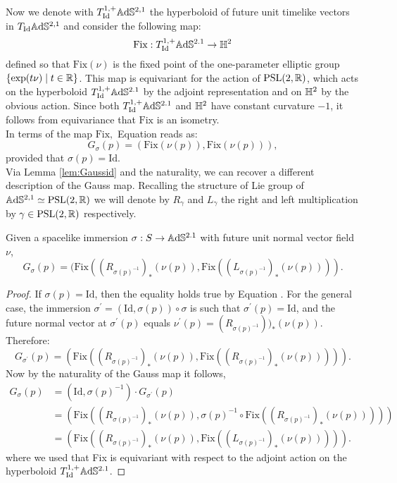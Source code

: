 Now we denote with $T_{\text{Id}}^{1,+}\mathbb{A}\mathrm{d}\mathbb{S}^{2,1}$ the hyperboloid of future unit timelike vectors in $T_{\text{Id}}\mathbb{A}\mathrm{d}\mathbb{S}^{2,1}$ and consider the following map: 
\[
    \text{Fix}:T_{\text{Id}}^{1,+}\mathbb{A}\mathrm{d}\mathbb{S}^{2.1}\to\mathbb{H}^2
\]
defined so that $\text{Fix}(\nu)$ is the fixed point of the one-parameter elliptic group $\{\exp(t\nu)\;|\;t\in\mathbb{R}\}$. This map is equivariant for the action of $\text{PSL}(2,\mathbb{R})$, which acts on the hyperboloid $T_{\text{Id}}^{1,+}\mathbb{A}\mathrm{d}\mathbb{S}^{2.1}$ by the adjoint representation and on $\mathbb{H}^2$ by the obvious action. Since both $T_{\text{Id}}^{1,+}\mathbb{A}\mathrm{d}\mathbb{S}^{2.1}$ and $\mathbb{H}^2$ have constant curvature $-1$, it follows from equivariance that $\text{Fix}$ is an isometry.  \\
In terms of the map $\text{Fix},$ Equation  reads as: 
\begin{equation}\label{eq:Gaussfix}
    G_\sigma(p)=(\text{Fix}(\nu(p)),\text{Fix}(\nu(p))),
\end{equation}
provided that $\sigma(p)=\text{Id}.$\\ Via Lemma \ref{lem:Gaussid} and the naturality, we can recover a different description of the Gauss map. Recalling the structure of Lie group of $\mathbb{A}\mathrm{d}\mathbb{S}^{2,1}\simeq\text{PSL}(2,\mathbb{R})$ we will denote by $R_{\gamma } $ and $L_{\gamma} $ the right and left multiplication by $\gamma\in\text{PSL}(2,\mathbb{R})$ respectively. 

\begin{lemma}\label{lem:gauss fix}
    Given a spacelike immersion $\sigma: S\to \mathbb{A}\mathrm{d}\mathbb{S}^{2.1}$ with future unit normal vector field $\nu$,
    \[
        G_\sigma(p)=(\text{Fix}((R_{\sigma(p)^{-1}})_* (\nu(p)),\text{Fix}((L_{\sigma(p)^{-1}})_* (\nu(p)))).
    \]
\end{lemma}

\begin{proof}
    If $\sigma(p)=\text{Id}$, then the equality holds true by Equation . For the general case, the immersion $\sigma^{\prime} =(\text{Id},\sigma(p))\circ\sigma$ is such that $\sigma^{\prime}(p)=\text{Id}$, and the future normal vector at $\sigma^{\prime} (p)$ equals $\nu^{\prime} (p)=(R_{\sigma(p)^{-1}}))_{\ast} (\nu(p))$. Therefore: 
    \[
        G_{\sigma^{\prime} }(p)=(\text{Fix}((R_{\sigma(p)^{-1}})_{\ast} (\nu(p)),\text{Fix}((R_{\sigma(p)^{-1}})_{\ast} (\nu(p))))).
    \]
    Now by the naturality of the Gauss map it follows,     
    \begin{align*}
        G_\sigma(p)&=(\text{Id},\sigma(p)^{-1})\cdot G_{\sigma^{\prime}}(p) \\
        &=(\text{Fix}((R_{\sigma(p)^{-1}})_{\ast} (\nu(p)),\sigma(p)^{-1}\circ\text{Fix}((R_{\sigma(p)^{-1}})_{\ast} (\nu(p))))) \\
        &=(\text{Fix}((R_{\sigma(p)^{-1}})_{\ast} (\nu(p)),\text{Fix}((L_{\sigma(p)^{-1}})_{\ast} (\nu(p))))).
    \end{align*}
    where we used that Fix is equivariant with respect to the adjoint action on the hyperboloid $T_{\text{Id}}^{1,+}\mathbb{A}\mathrm{d}\mathbb{S}^{2.1}$.
\end{proof}

